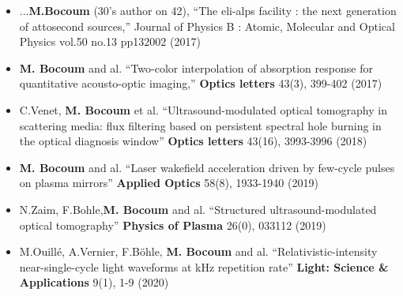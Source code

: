 \documentclass[11pt,a4paper,sans]{moderncv} %
\begin{document}
\begin{itemize}
\item ...\textbf{M.Bocoum} (30's author on 42), “The eli-alps facility : the next generation of attosecond sources,” Journal of Physics B : Atomic, Molecular and Optical Physics vol.50 no.13 pp132002 (2017)

\item  \textbf{M. Bocoum} and al. “Two-color interpolation of absorption response for quantitative acousto-optic imaging,” \textbf{Optics letters} 43(3), 399-402 (2017)

\item  C.Venet, \textbf{M. Bocoum} et al. “Ultrasound-modulated optical tomography in scattering media: flux filtering based on persistent spectral hole burning in the optical diagnosis window” \textbf{Optics letters} 43(16), 3993-3996 (2018)

\item  \textbf{M. Bocoum} and al. “Laser wakefield acceleration driven by few-cycle pulses on plasma mirrors” \textbf{Applied Optics} 58(8), 1933-1940 (2019)

\item  N.Zaim, F.Bohle,\textbf{M. Bocoum} and al. “Structured ultrasound-modulated optical tomography” \textbf{Physics of Plasma} 26(0), 033112 (2019)

\item  M.Ouillé, A.Vernier, F.Böhle, \textbf{M. Bocoum} and al. “Relativistic-intensity near-single-cycle light waveforms at kHz repetition rate” \textbf{Light: Science \& Applications} 9(1), 1-9 (2020)


\end{itemize}

\end{document}

